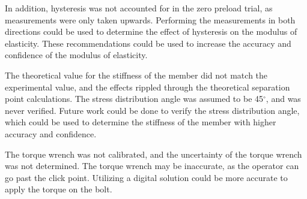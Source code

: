 In addition, hysteresis was not accounted for in the zero preload trial, as measurements were only taken upwards. Performing the measurements in both directions could be used to determine the effect of hysteresis on the modulus of elasticity. These recommendations could be used to increase the accuracy and confidence of the modulus of elasticity.

The theoretical value for the stiffness of the member did not match the experimental value, and the effects rippled through the theoretical separation point calculations. The stress distribution angle was assumed to be 45$^\circ$, and was never verified. Future work could be done to verify the stress distribution angle, which could be used to determine the stiffness of the member with higher accuracy and confidence.

The torque wrench was not calibrated, and the uncertainty of the torque wrench was not determined. The torque wrench may be inaccurate, as the operator can go past the click point. Utilizing a digital solution could be more accurate to apply the torque on the bolt.